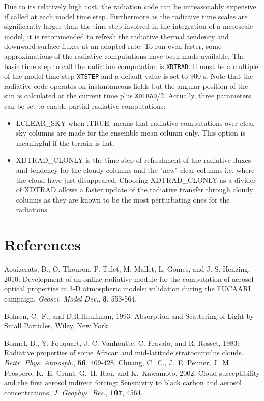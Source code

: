 Due to its relatively high cost, the radiation code can be unreasonably expensive if called at each model time step. Furthermore as the radiative time scales are significantly larger than the time step involved in the integration of a mesoscale model, it is recommended to refresh the radiative thermal tendency and downward surface fluxes at an adapted rate. To run even faster, some approximations of the radiative computations have been made available. The basic time step to call the radiation computation is {\tt XDTRAD}. Il must be a multiple of the model time step {\tt XTSTEP} and a default value is set to 900 s. Note that the radiative code operates on instantaneous fields but the angular position of the sun is calculated at the current time plus {\tt XDTRAD}/2. Actually, three parameters can be set to enable partial radiative computations:

\begin{itemize}
\item LCLEAR\_SKY when .TRUE. means that radiative computations over clear sky columns are made for the ensemble mean column only. This option is meaningful if the terrain is flat.

\item XDTRAD\_CLONLY is the time step of refreshment of the radiative fluxes and tendency for the cloudy columns and the "new" clear columns i.e. where the cloud have just disappeared. Choosing XDTRAD\_CLONLY as a divider of XDTRAD allows a faster update of the radiative transfer through cloudy columns as they are known to be the most perturbating ones for the radiations. 

\end{itemize}

\section{References}
\decrefname
Aouizerats, B., O. Thouron, P. Tulet, M. Mallet, L. Gomes, and J. S. Henzing, 2010:
Development of an online radiative module for the computation of aerosol optical properties in 3-D atmospheric models: validation during the EUCAARI campaign.
{\it  Geosci. Model Dev.}, {\bf 3}, 553-564.

\decrefname
Bohren, C.~F., and D.R.Hauffman, 1993: Absorption and Scattering of Light by
  Small Particles, Wiley, New York.

\decrefname
Bonnel, B., Y. Fouquart, J.-C. Vanhoutte, C. Fravalo, and R. Rosset, 1983:
      Radiative properties of some African and mid-latitude stratocumulus
      clouds.
      {\it Beitr. Phys. Atmosph.},
      {\bf 56},
      409-428.
\decrefname
Chuang, C.~C., J.~E. Penner, J.~M. Prospero, K.~E. Grant, G.~H. Rau, and
  K.~Kawamoto, 2002: Cloud susceptibility and the first aerosol indirect
  forcing: Sensitivity to black carbon and aerosol concentrations,
  {\it J. Geophys. Res.}, {\bf 107}, 4564.

